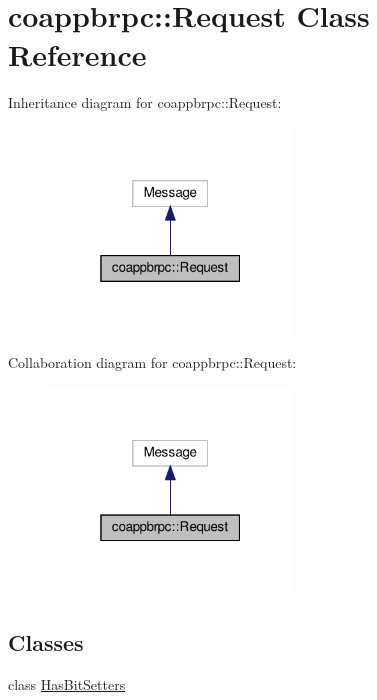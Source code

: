 \hypertarget{classcoappbrpc_1_1Request}{}\section{coappbrpc\+:\+:Request Class Reference}
\label{classcoappbrpc_1_1Request}


Inheritance diagram for coappbrpc\+:\+:Request\+:\nopagebreak
\begin{figure}[H]
\begin{center}
\leavevmode
\includegraphics[width=184pt]{classcoappbrpc_1_1Request__inherit__graph}
\end{center}
\end{figure}


Collaboration diagram for coappbrpc\+:\+:Request\+:\nopagebreak
\begin{figure}[H]
\begin{center}
\leavevmode
\includegraphics[width=184pt]{classcoappbrpc_1_1Request__coll__graph}
\end{center}
\end{figure}
\subsection*{Classes}
\begin{DoxyCompactItemize}
\item 
class \hyperlink{classcoappbrpc_1_1Request_1_1HasBitSetters}{Has\+Bit\+Setters}
\end{DoxyCompactItemize}
